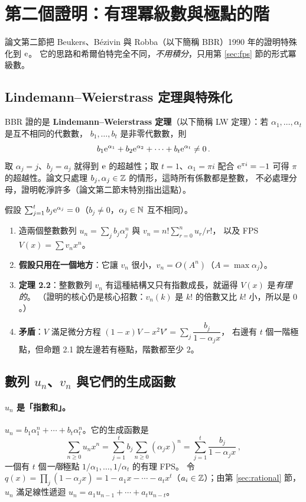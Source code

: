 \section{第二個證明：有理冪級數與極點的階}\label{sec:bbr}

論文第二節把 Beukers、Bézivin 與 Robba（以下簡稱 BBR）1990 年的證明特殊化到 $\mathrm{e}$。
它的思路和希爾伯特完全不同，\emph{不用積分}，只用第 \ref{sec:fps} 節的形式冪級數。

\subsection{Lindemann--Weierstrass 定理與特殊化}

BBR 證的是 \textbf{Lindemann--Weierstrass 定理}（以下簡稱 LW 定理）：若 $\alpha_1,\ldots,\alpha_t$ 是互不相同的代數數，
$b_1,\ldots,b_t$ 是非零代數數，則
\[
  b_1\mathrm{e}^{\alpha_1}+b_2\mathrm{e}^{\alpha_2}+\cdots+b_t\mathrm{e}^{\alpha_t}\neq0\,.
\]
取 $\alpha_j=j$、$b_j=a_j$ 就得到 $\mathrm{e}$ 的超越性；取 $t=1$、$\alpha_1=\pi i$ 配合 $\mathrm{e}^{\pi i}=-1$
可得 $\pi$ 的超越性。論文只處理 $b_j,\alpha_j\in\mathbb{Z}$ 的情形，這時所有係數都是整數，
不必處理分母，證明乾淨許多（論文第二節末特別指出這點）。

\begin{keyidea}
假設 $\sum_{j=1}^{t}b_j\mathrm{e}^{\alpha_j}=0$（$b_j\neq0$，$\alpha_j\in\mathbb{N}$ 互不相同）。
\begin{enumerate}
  \item 造兩個整數數列 $u_n=\sum_j b_j\alpha_j^{n}$ 與 $v_n=n!\sum_{r=0}^{n}u_r/r!$，
        以及 FPS $V(x)=\sum v_nx^n$。
  \item \textbf{假設只用在一個地方}：它讓 $v_n$ 很小，$v_n=O(A^n)$（$A=\max\alpha_j$）。
  \item \textbf{定理 2.2}：整數數列 $v_n$ 有這種結構又只有指數成長，就逼得 $V(x)$ 是\emph{有理的}。
        （證明的核心仍是核心招數：$v_n(k)$ 是 $k!$ 的倍數又比 $k!$ 小，所以是 $0$。）
  \item \textbf{矛盾}：$V$ 滿足微分方程 $(1-x)V-x^{2}V'=\sum_j\dfrac{b_j}{1-\alpha_jx}$，
        右邊有 $t$ 個一階極點，但命題 2.1 說左邊若有極點，階數都至少 $2$。
\end{enumerate}
\end{keyidea}

\subsection{數列 $u_n$、$v_n$ 與它們的生成函數}

\paragraph{$u_n$ 是「指數和」。}
$u_n=b_1\alpha_1^{n}+\cdots+b_t\alpha_t^{n}$。它的生成函數是
\[
  \sum_{n\ge0}u_nx^n=\sum_{j=1}^{t}b_j\sum_{n\ge0}(\alpha_jx)^n=\sum_{j=1}^{t}\frac{b_j}{1-\alpha_jx}\,,
\]
一個有 $t$ 個\emph{一階}極點 $1/\alpha_1,\ldots,1/\alpha_t$ 的有理 FPS。
令 $q(x)=\prod_j(1-\alpha_jx)=1-a_1x-\cdots-a_tx^t$（$a_i\in\mathbb{Z}$）；由第 \ref{sec:rational} 節，
$u_n$ 滿足線性遞迴 $u_n=a_1u_{n-1}+\cdots+a_tu_{n-t}$。

